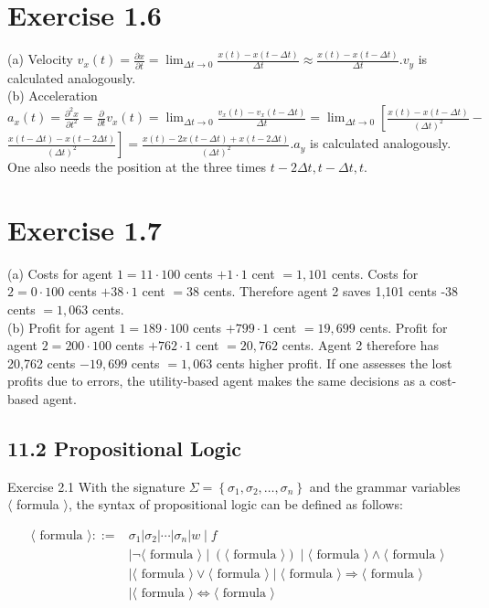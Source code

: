 \documentclass[10pt]{article}
\begin{document}
\section*{Exercise 1.6}
(a) Velocity $v_{x}(t)=\frac{\partial x}{\partial t}=\lim _{\Delta t \rightarrow 0} \frac{x(t)-x(t-\Delta t)}{\Delta t} \approx \frac{x(t)-x(t-\Delta t)}{\Delta t} . v_{y}$ is calculated analogously.\\
(b) Acceleration $a_{x}(t)=\frac{\partial^{2} x}{\partial t^{2}}=\frac{\partial}{\partial t} v_{x}(t)=\lim _{\Delta t \rightarrow 0} \frac{v_{x}(t)-v_{x}(t-\Delta t)}{\Delta t}=\lim _{\Delta t \rightarrow 0}\left[\frac{x(t)-x(t-\Delta t)}{(\Delta t)^{2}}-\right.$ $\left.\frac{x(t-\Delta t)-x(t-2 \Delta t)}{(\Delta t)^{2}}\right]=\frac{x(t)-2 x(t-\Delta t)+x(t-2 \Delta t)}{(\Delta t)^{2}} . a_{y}$ is calculated analogously. One also needs the position at the three times $t-2 \Delta t, t-\Delta t, t$.

\section*{Exercise 1.7}
(a) Costs for agent $1=11 \cdot 100$ cents $+1 \cdot 1$ cent $=1,101$ cents. Costs for $2=0 \cdot 100$ cents $+38 \cdot 1$ cent $=38$ cents. Therefore agent 2 saves 1,101 cents -38 cents $=1,063$ cents.\\
(b) Profit for agent $1=189 \cdot 100$ cents $+799 \cdot 1$ cent $=19,699$ cents. Profit for agent $2=200 \cdot 100$ cents $+762 \cdot 1$ cent $=20,762$ cents. Agent 2 therefore has 20,762 cents $-19,699$ cents $=1,063$ cents higher profit. If one assesses the lost profits due to errors, the utility-based agent makes the same decisions as a cost-based agent.

\subsection*{11.2 Propositional Logic}
Exercise 2.1 With the signature $\Sigma=\left\{\sigma_{1}, \sigma_{2}, \ldots, \sigma_{n}\right\}$ and the grammar variables $\langle$ formula $\rangle$, the syntax of propositional logic can be defined as follows:

$$
\begin{aligned}
\langle\text { formula }\rangle::= & \sigma_{1}\left|\sigma_{2}\right| \cdots\left|\sigma_{n}\right| w \mid f \\
& \mid \neg\langle\text { formula }\rangle \mid(\langle\text { formula }\rangle) \mid\langle\text { formula }\rangle \wedge\langle\text { formula }\rangle \\
& \mid\langle\text { formula }\rangle \vee\langle\text { formula }\rangle \mid\langle\text { formula }\rangle \Rightarrow\langle\text { formula }\rangle \\
& \mid\langle\text { formula }\rangle \Leftrightarrow\langle\text { formula }\rangle
\end{aligned}
$$
\end{document}
